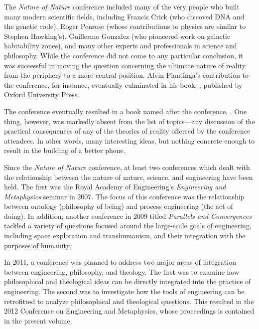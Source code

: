 The \textit{Nature of Nature} conference included many of the very people who built many modern scientific fields, including Francis Crick (who discoved DNA and the genetic code), Roger Penrose (whose contributions to physics are similar to Stephen Hawking's), Guillermo Gonzalez (who pioneered work on galactic habitability zones), and many other experts and professionals in science and philosophy.  While the conference did not come to any particular conclusion, it was successful in moving the question concerning the ultimate nature of reality from the periphery to a more central position.  Alvin Plantinga's contribution to the conference, for instance, eventually culminated in his book, , published by Oxford University Press.\citep{plantinga2011, plantinga2011b}

The conference eventually resulted in a book named after the conference, .\citep{natnat2011}  One thing, however, was markedly absent from the list of topics---any discussion of the practical consequences of any of the theories of reality offerred by the conference attendees.  In other words, many interesting ideas, but nothing concrete enough to result in the building of a better phone.

Since the \textit{Nature of Nature} conference, at least two conferences which dealt with the relationship between the nature of nature, science, and engineering have been held.
The first was the Royal Academy of Engineering's \textit{Engineering and Metaphysics} seminar in 2007.  The focus of this conference was the relationship between ontology (philosophy of being) and process engineering (the act of doing).  In addition, another conference in 2009 titled \textit{Parallels and Convergences} tackled a variety of questions focused around the large-scale goals of engineering, including space exploration and transhumanism, and their integration with the purposes of humanity.  

In 2011, a conference was planned to address two major areas of integration between engineering, philosophy, and theology.  The first was to examine how philosophical and theological ideas can be directly integrated into the practice of engineering.  The second was to investigate how the tools of engineering can be retrofitted to analyze philosophical and theological questions.  This resulted in the 2012 Conference on Engineering and Metaphysics, whose proceedings is contained in the present volume.

